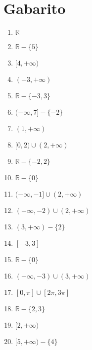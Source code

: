 \documentclass[11pt]{article}
\begin{document}
\section*{Gabarito}
\begin{multicols}{2}
\begin{enumerate}
    \item $\mathbb{R}$
    \item $\mathbb{R} - \{5\}$
    \item $[4, +\infty)$
    \item $(-3, +\infty)$
    \item $\mathbb{R} - \{-3, 3\}$
    \item $(-\infty, 7] - \{-2\}$
    \item $(1, +\infty)$
    \item $[0, 2) \cup (2, +\infty)$
    \item $\mathbb{R} - \{-2, 2\}$
    \item $\mathbb{R} - \{0\}$
    \item $(-\infty, -1] \cup (2, +\infty)$
    \item $(-\infty, -2) \cup (2, +\infty)$
    \item $(3, +\infty) - \{2\}$
    \item $[-3, 3]$
    \item $\mathbb{R} - \{0\}$
    \item $(-\infty, -3) \cup (3, +\infty)$
    \item $\left[0, \pi\right] \cup \left[2\pi, 3\pi\right]$
    \item $\mathbb{R} - \{2, 3\}$
    \item $[2, +\infty)$
    \item $[5, +\infty) - \{4\}$
\end{enumerate}
\end{multicols}
\end{document}
